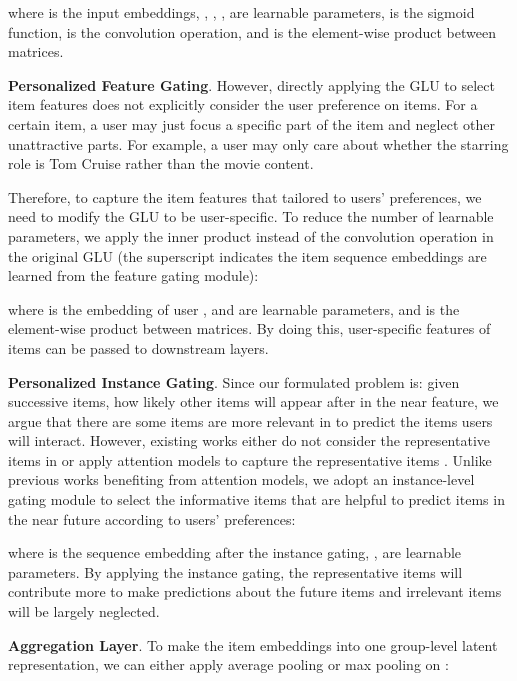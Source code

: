 \documentclass[sigconf]{acmart}
\makeatletter
\def\subsubsection{\@startsection{subsubsection}{3}\z@{.3\linespacing\@plus.7\linespacing}{.1\linespacing}{\normalfont\itshape}}
\makeatother
\begin{document}
where  is the input embeddings, , , ,  are learnable parameters,  is the sigmoid function,  is the convolution operation, and  is the element-wise product between matrices.

\textbf{Personalized Feature Gating}. However, directly applying the GLU to select item features does not explicitly consider the user preference on items. For a certain item, a user may just focus a specific part of the item and neglect other unattractive parts. For example, a user may only care about whether the starring role is Tom Cruise rather than the movie content. 

Therefore, to capture the item features that tailored to users' preferences, we need to modify the GLU to be user-specific. To reduce the number of learnable parameters, we apply the inner product instead of the convolution operation in the original GLU (the superscript  indicates the item sequence embeddings are learned from the feature gating module):

where  is the embedding of user ,  and  are learnable parameters, and  is the element-wise product between matrices. By doing this, user-specific features of items can be passed to downstream layers.

\subsubsection{Instance Gating}
\textbf{Personalized Instance Gating}. Since our formulated problem is: given  successive items, how likely other items will appear after  in the near feature, we argue that there are some items are more relevant in  to predict the items users will interact. However, existing works either do not consider the representative items in  \cite{DBLP:conf/wsdm/TangW18,DBLP:conf/cikm/HidasiK18} or apply attention models to capture the representative items \cite{DBLP:conf/cikm/LiRCRLM17,DBLP:conf/icdm/KangM18}. Unlike previous works benefiting from attention models, we adopt an instance-level gating module to select the informative items that are helpful to predict items in the near future according to users' preferences:

where  is the sequence embedding after the instance gating, ,  are learnable parameters. By applying the instance gating, the representative items will contribute more to make predictions about the future items and irrelevant items will be largely neglected.

\textbf{Aggregation Layer}. To make the item embeddings  into one group-level latent representation, we can either apply average pooling or max pooling on :
\end{document}
